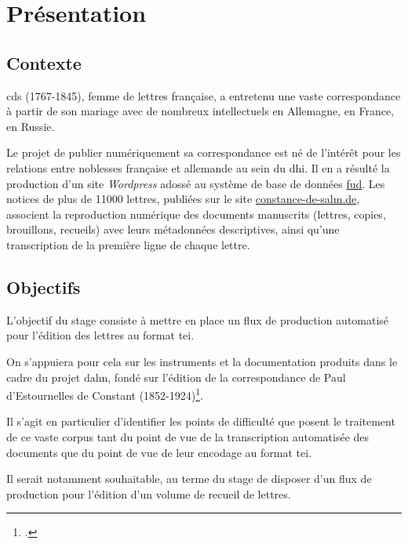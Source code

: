 \documentclass[a4paper,12pt,twoside]{book}
\begin{document}
	
	\tableofcontents
	
	\chapter*{Présentation}
	
		\section*{Contexte}
			\gls{cds} (1767-1845), femme de lettres française, a entretenu une vaste correspondance à partir de son mariage avec de nombreux intellectuels en Allemagne, en France, en Russie.
	
			Le projet de publier numériquement sa correspondance est né de l'intérêt pour les relations entre noblesses française et allemande au sein du \gls{dhi}. Il en a résulté la production d'un site \textit{Wordpress} adossé au système de base de données \href{https://fud.uni-trier.de/}{\gls{fud}}. Les notices de plus de 11000 lettres, publiées sur le site \href{https://constance-de-salm.de}{constance-de-salm.de}, associent la reproduction numérique des documents manuscrits (lettres, copies, brouillons, recueils) avec leurs métadonnées descriptives, ainsi qu'une transcription de la première ligne de chaque lettre.
	
		\section*{Objectifs}
			L'objectif du stage consiste à mettre en place un flux de production automatisé pour l'édition des lettres au format \gls{tei}. 
			
			On s'appuiera pour cela sur les instruments et la documentation produits dans le cadre du projet \gls{dahn}, fondé sur l'édition de la correspondance de Paul d’Estournelles de Constant (1852-1924)\footcite{chiffoleauDAHNProject}.
			
			Il s'agit en particulier d'identifier les points de difficulté que posent le traitement de ce vaste corpus tant du point de vue de la transcription automatisée des documents que du point de vue de leur encodage au format \gls{tei}. 
			
			Il serait notamment souhaitable, au terme du stage de disposer d'un flux de production pour l'édition d'un volume de recueil de lettres.
				
\end{document}
